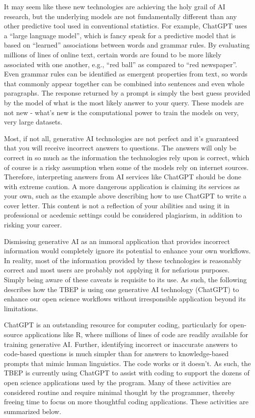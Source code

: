 \documentclass[
]{book}
\begin{document}
It may seem like these new technologies are achieving the holy grail of AI research, but the underlying models are not fundamentally different than any other predictive tool used in conventional statistics. For example, ChatGPT uses a ``large language model'', which is fancy speak for a predictive model that is based on ``learned'' associations between words and grammar rules. By evaluating millions of lines of online text, certain words are found to be more likely associated with one another, e.g., ``red ball'' as compared to ``red newspaper''. Even grammar rules can be identified as emergent properties from text, so words that commonly appear together can be combined into sentences and even whole paragraphs. The response returned by a prompt is simply the best guess provided by the model of what is the most likely answer to your query. These models are not new - what's new is the computational power to train the models on very, very large datasets.

Most, if not all, generative AI technologies are not perfect and it's guaranteed that you will receive incorrect answers to questions. The answers will only be correct in so much as the information the technologies rely upon is correct, which of course is a risky assumption when some of the models rely on internet sources. Therefore, interpreting answers from AI services like ChatGPT should be done with extreme caution. A more dangerous application is claiming its services as your own, such as the example above describing how to use ChatGPT to write a cover letter. This content is not a reflection of your abilities and using it in professional or acedemic settings could be considered plagiarism, in addition to risking your career.

Dismissing generative AI as an immoral application that provides incorrect information would completely ignore its potential to enhance your own workflows. In reality, most of the information provided by these technologies is reasonably correct and most users are probably not applying it for nefarious purposes. Simply being aware of these caveats is requisite to its use. As such, the following describes how the TBEP is using one generative AI technology (ChatGPT) to enhance our open science workflows without irresponsible application beyond its limitations.

ChatGPT is an outstanding resource for computer coding, particularly for open-source applications like R, where millions of lines of code are readily available for training generative AI. Further, identifying incorrect or inaccurate answers to code-based questions is much simpler than for answers to knowledge-based prompts that mimic human linguistics. The code works or it doesn't. As such, the TBEP is currently using ChatGPT to assist with coding to support the dozens of open science applications used by the program. Many of these activities are considered routine and require minimal thought by the programmer, thereby freeing time to focus on more thoughtful coding applications. These activities are summarized below.
\end{document}
